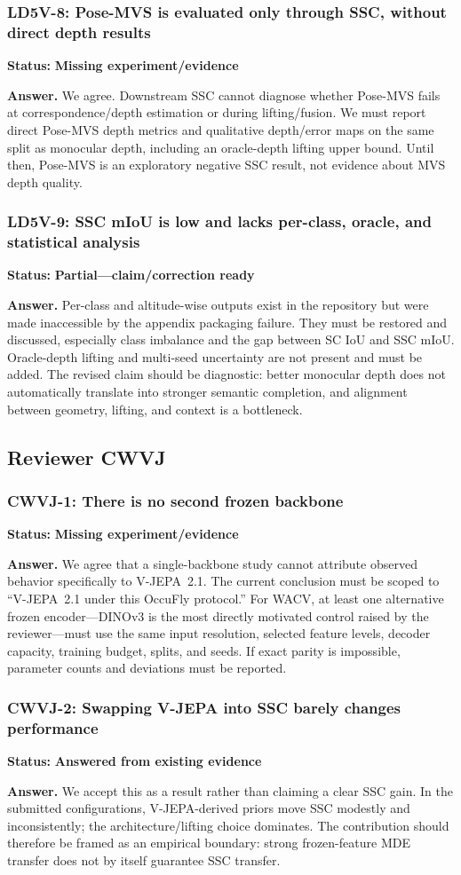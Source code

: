 \documentclass[10pt]{article}
\newcommand{\answered}{\textcolor{answered}{\textbf{Answered from existing evidence}}}
\newcommand{\partialstatus}{\textcolor{partial}{\textbf{Partial---claim/correction ready}}}
\newcommand{\missing}{\textcolor{missing}{\textbf{Missing experiment/evidence}}}
\newcommand{\reviewer}[1]{\subsection{Reviewer #1}}
\newenvironment{reviewpoint}[2]
  {\subsubsection{#1}\noindent\textbf{Status:} #2\par\smallskip}
  {}
\begin{document}
\begin{reviewpoint}{LD5V-8: Pose-MVS is evaluated only through SSC, without direct depth results}{\missing}
\textbf{Answer.} We agree. Downstream SSC cannot diagnose whether Pose-MVS fails at
correspondence/depth estimation or during lifting/fusion. We must report direct Pose-MVS
depth metrics and qualitative depth/error maps on the same split as monocular depth,
including an oracle-depth lifting upper bound. Until then, Pose-MVS is an exploratory
negative SSC result, not evidence about MVS depth quality.
\end{reviewpoint}

\begin{reviewpoint}{LD5V-9: SSC mIoU is low and lacks per-class, oracle, and statistical analysis}{\partialstatus}
\textbf{Answer.} Per-class and altitude-wise outputs exist in the repository but were made
inaccessible by the appendix packaging failure. They must be restored and discussed,
especially class imbalance and the gap between SC IoU and SSC mIoU. Oracle-depth lifting
and multi-seed uncertainty are not present and must be added. The revised claim should be
diagnostic: better monocular depth does not automatically translate into stronger semantic
completion, and alignment between geometry, lifting, and context is a bottleneck.
\end{reviewpoint}

\reviewer{CWVJ}

\begin{reviewpoint}{CWVJ-1: There is no second frozen backbone}{\missing}
\textbf{Answer.} We agree that a single-backbone study cannot attribute observed behavior
specifically to V-JEPA~2.1. The current conclusion must be scoped to ``V-JEPA~2.1 under
this OccuFly protocol.'' For WACV, at least one alternative frozen encoder---DINOv3 is the
most directly motivated control raised by the reviewer---must use the same input
resolution, selected feature levels, decoder capacity, training budget, splits, and seeds.
If exact parity is impossible, parameter counts and deviations must be reported.
\end{reviewpoint}

\begin{reviewpoint}{CWVJ-2: Swapping V-JEPA into SSC barely changes performance}{\answered}
\textbf{Answer.} We accept this as a result rather than claiming a clear SSC gain. In the
submitted configurations, V-JEPA-derived priors move SSC modestly and inconsistently; the
architecture/lifting choice dominates. The contribution should therefore be framed as an
empirical boundary: strong frozen-feature MDE transfer does not by itself guarantee SSC
transfer.
\end{reviewpoint}
\end{document}
